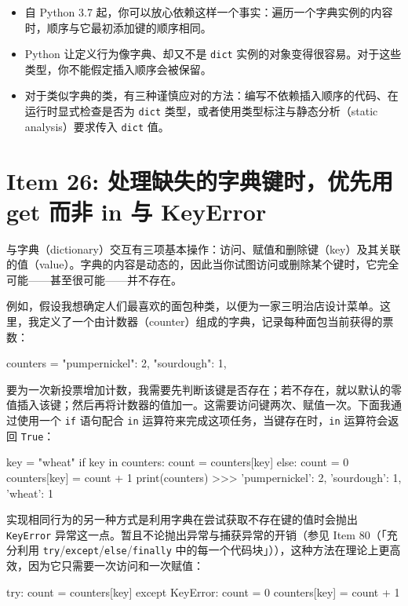 \begin{itemize}
\item 自 Python 3.7 起，你可以放心依赖这样一个事实：遍历一个字典实例的内容时，顺序与它最初添加键的顺序相同。
\item Python 让定义行为像字典、却又不是 \texttt{dict} 实例的对象变得很容易。对于这些类型，你不能假定插入顺序会被保留。
\item 对于类似字典的类，有三种谨慎应对的方法：编写不依赖插入顺序的代码、在运行时显式检查是否为 \texttt{dict} 类型，或者使用类型标注与静态分析（static analysis）要求传入 \texttt{dict} 值。
\end{itemize}

\section{Item 26: 处理缺失的字典键时，优先用 get 而非 in 与 KeyError}

与字典（dictionary）交互有三项基本操作：访问、赋值和删除键（key）及其关联的值（value）。字典的内容是动态的，因此当你试图访问或删除某个键时，它完全可能——甚至很可能——并不存在。

例如，假设我想确定人们最喜欢的面包种类，以便为一家三明治店设计菜单。这里，我定义了一个由计数器（counter）组成的字典，记录每种面包当前获得的票数：

\begin{codebox}[python]
counters = {
    "pumpernickel": 2,
    "sourdough": 1,
}
\end{codebox}

要为一次新投票增加计数，我需要先判断该键是否存在；若不存在，就以默认的零值插入该键；然后再将计数器的值加一。这需要访问键两次、赋值一次。下面我通过使用一个 \texttt{if} 语句配合 \texttt{in} 运算符来完成这项任务，当键存在时，\texttt{in} 运算符会返回 \texttt{True}：

\begin{codebox}[python]
key = "wheat"
if key in counters:
    count = counters[key]
else:
    count = 0
counters[key] = count + 1
print(counters)
>>>
{'pumpernickel': 2, 'sourdough': 1, 'wheat': 1}
\end{codebox}

实现相同行为的另一种方式是利用字典在尝试获取不存在键的值时会抛出 \texttt{KeyError} 异常这一点。暂且不论抛出异常与捕获异常的开销（参见 Item 80（「充分利用 \texttt{try}/\texttt{except}/\texttt{else}/\texttt{finally} 中的每一个代码块」）），这种方法在理论上更高效，因为它只需要一次访问和一次赋值：

\begin{codebox}[python]
try:
    count = counters[key]
except KeyError:
    count = 0
counters[key] = count + 1
\end{codebox}

